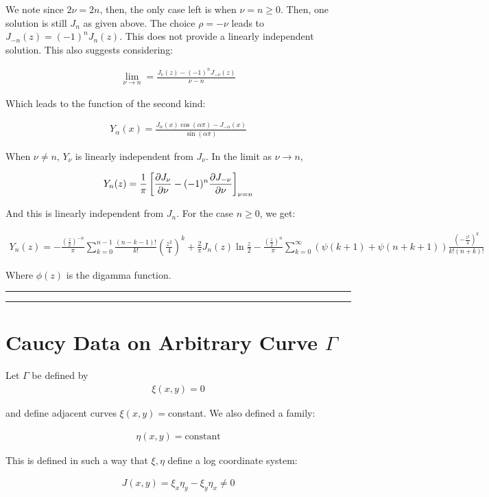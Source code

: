 \documentclass{article}
\theoremstyle{definition}
\newcommand{\Section}[1]{\hrule\hrule\section{#1}}
\newcommand{\eq}[1]{\begin{align*}
	#1
	\end{align*}}
\begin{document}
We note since $2\nu = 2n$, then, the only case left is when $\nu = n \geq 0$. Then, one solution is still $J_n$ as given above. The choice $\rho=-\nu$ leads to $J_{-n}(z) = (-1)^n J_n(z)$. This does not provide a linearly independent solution.  This also suggests considering:

\begin{align*}
\lim_{\nu\to n} = \frac{J_\nu(z) - (-1)^nJ_{-\nu}(z)}{\nu-n}
\end{align*}

Which leads to the function of the second kind:

\begin{align*}
Y_{\alpha }(x)={\frac {J_{\alpha }(x)\cos(\alpha \pi )-J_{-\alpha }(x)}{\sin(\alpha \pi )}}
\end{align*}


When $\nu \neq n$, $Y_\nu$ is linearly independent from $J_\nu$. In the limit as $\nu \to n$, 

\begin{align*}
Y_n(z) = \frac{1}{\pi}  \left[\pdv{J_\nu}{\nu} - (-1)^n \pdv{J_{-\nu}}{\nu}  \right]_{\nu=n}
\end{align*}

And this is linearly independent from $J_n$. For the case $n\geq 0$, we get:

\begin{align*}
 Y_{n}(z)=-{\frac {\left({\frac {z}{2}}\right)^{-n}}{\pi }}\sum _{k=0}^{n-1}{\frac {(n-k-1)!}{k!}}\left({\frac {z^{2}}{4}}\right)^{k}+{\frac {2}{\pi }}J_{n}(z)\ln {\frac {z}{2}}-{\frac {\left({\frac {z}{2}}\right)^{n}}{\pi }}\sum _{k=0}^{\infty }(\psi (k+1)+\psi (n+k+1)){\frac {\left(-{\frac {z^{2}}{4}}\right)^{k}}{k!(n+k)!}}
\end{align*}

Where $\phi(z)$ is the digamma function.


\Section{Caucy Data on Arbitrary Curve $\Gamma$}
Let $\Gamma$ be defined by 
\eq{\xi (x,y) = 0}

and define adjacent curves $\xi(x,y) = $constant. We also defined a family:

\eq{\eta(x,y)= \text{constant}}

This is defined in such a way that $\xi, \eta$ define a log coordinate system:

\begin{align*}
J(x,y) = \xi_x \eta_y - \xi_y \eta_x \neq 0
\end{align*}
\end{document}
